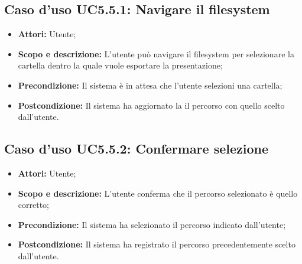 	\subsection{Caso d'uso UC5.5.1: Navigare il filesystem}
	\begin{itemize}
		\item \textbf{Attori:} Utente;
		\item \textbf{Scopo e descrizione:} L'utente può navigare il filesystem per selezionare la cartella dentro la quale vuole esportare la presentazione;
		\item \textbf{Precondizione:} Il sistema è in attesa che l'utente selezioni una cartella;
		\item \textbf{Postcondizione:} Il sistema ha aggiornato la il percorso con quello scelto dall'utente.
	\end{itemize}
	
	\subsection{Caso d'uso UC5.5.2: Confermare selezione}
	\begin{itemize}
		\item \textbf{Attori:} Utente;
		\item \textbf{Scopo e descrizione:} L'utente conferma che il percorso selezionato è quello corretto;
		\item \textbf{Precondizione:} Il sistema ha selezionato il percorso indicato dall'utente;
		\item \textbf{Postcondizione:} Il sistema ha registrato il percorso precedentemente scelto dall'utente.
	\end{itemize}